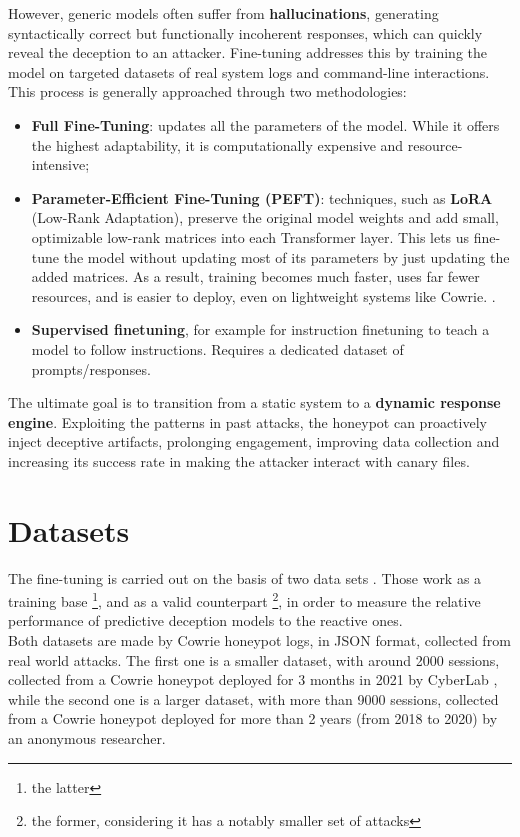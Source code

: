 \documentclass[10pt,a4paper,twocolumn]{article}
\begin{document}
However, generic models often suffer from \textbf{hallucinations}, generating syntactically correct but functionally incoherent responses, which can quickly reveal the deception to an attacker. Fine-tuning addresses this by training the model on targeted datasets of real system logs and command-line interactions. This process is generally approached through two methodologies:
\begin{itemize}
    \item \textbf{Full Fine-Tuning}: updates all the parameters of the model. While it offers the highest adaptability, it is computationally expensive and resource-intensive;
    \item \textbf{Parameter-Efficient Fine-Tuning (PEFT)}: techniques, such as \textbf{LoRA} (Low-Rank Adaptation), preserve the original model weights and add small, optimizable low-rank matrices into each Transformer layer. This lets us fine-tune the model without updating most of its parameters by just updating the added matrices. As a result, training becomes much faster, uses far fewer resources, and is easier to deploy, even on lightweight systems like Cowrie. \cite{LLMFineTuning}.
    \item \textbf{Supervised finetuning}, for example for instruction finetuning to teach a model to follow instructions. Requires a dedicated dataset of prompts/responses.
\end{itemize}
The ultimate goal is to transition from a static system to a \textbf{dynamic response engine}. Exploiting the patterns in past attacks, the honeypot can proactively inject deceptive artifacts, prolonging engagement, improving data collection and increasing its success rate in making the attacker interact with canary files. 

\section{Datasets}
\label{sec:datasets}
The fine-tuning is carried out on the basis of two data sets \cite{CyberLab_JSON_DataSet} \cite{CowrieHoneypot_DataSet}. Those work as a training base \footnote{the latter}, and as a valid counterpart \footnote{the former, considering it has a notably smaller set of attacks}, in order to measure the relative performance of predictive deception models to the reactive ones.\\
Both datasets are made by Cowrie honeypot logs, in JSON format, collected from real world attacks. The first one \cite{CyberLab_JSON_DataSet} is a smaller dataset, with around 2000 sessions, collected from a Cowrie honeypot deployed for 3 months in 2021 by CyberLab \cite{CyberLab_website}, while the second one \cite{CowrieHoneypot_DataSet} is a larger dataset, with more than 9000 sessions, collected from a Cowrie honeypot deployed for more than 2 years (from 2018 to 2020) by an anonymous researcher.\\
\end{document}
